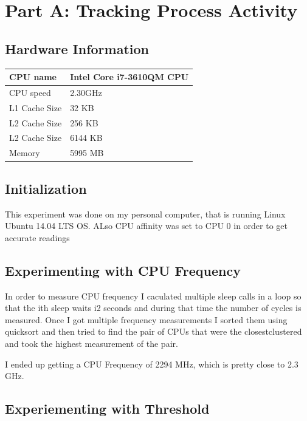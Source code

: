 \documentclass{article}
\begin{document}
\section{Part A: Tracking Process Activity}

\subsection{Hardware Information}

\begin{center}
\begin{tabular}{|l|l|}
  	\hline
  	CPU name & Intel Core i7-3610QM CPU \\ \hline
  	CPU speed & 2.30GHz \\ \hline
  	L1 Cache Size & 32 KB \\ \hline
	L2 Cache Size & 256 KB \\ \hline
	L2 Cache Size & 6144 KB \\ \hline
	Memory & 5995 MB \\ \hline
\end{tabular}
\end{center}

\subsection{Initialization}

This experiment was done on my personal computer, that is running Linux Ubuntu 14.04 LTS OS. ALso CPU affinity was set to CPU 0 in order to get accurate readings

\subsection{Experimenting with CPU Frequency}

In order to measure CPU frequency I caculated multiple sleep calls in a loop so that the ith sleep waits i\/2 seconds and during that time the number of cycles is measured. Once I got multiple frequency measurements I sorted them using quicksort and then tried to find the pair of CPUs that were the closest\/clustered and took the highest measurement of the pair. 

I ended up getting a CPU Frequency of 2294 MHz, which is pretty close to 2.3 GHz.

\subsection{Experiementing with Threshold}
\end{document}
